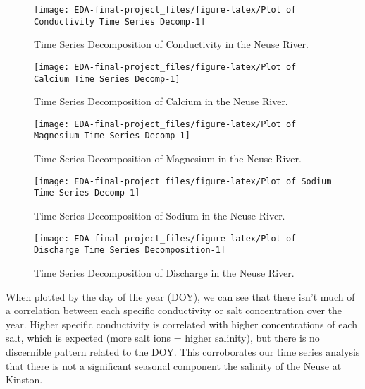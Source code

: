 \documentclass[
  12pt,
]{article}
\begin{document}
\begin{figure}

\texttt{[image: EDA-final-project\_files/figure-latex/Plot of Conductivity Time Series Decomp-1]} \hfill{}

\caption{Time Series Decomposition of Conductivity in the Neuse River.}\label{fig:Plot of Conductivity Time Series Decomp}
\end{figure}

\begin{figure}

\texttt{[image: EDA-final-project\_files/figure-latex/Plot of Calcium Time Series Decomp-1]} \hfill{}

\caption{Time Series Decomposition of Calcium in the Neuse River.}\label{fig:Plot of Calcium Time Series Decomp}
\end{figure}

\begin{figure}

\texttt{[image: EDA-final-project\_files/figure-latex/Plot of Magnesium Time Series Decomp-1]} \hfill{}

\caption{Time Series Decomposition of Magnesium in the Neuse River.}\label{fig:Plot of Magnesium Time Series Decomp}
\end{figure}

\begin{figure}

\texttt{[image: EDA-final-project\_files/figure-latex/Plot of Sodium Time Series Decomp-1]} \hfill{}

\caption{Time Series Decomposition of Sodium in the Neuse River.}\label{fig:Plot of Sodium Time Series Decomp}
\end{figure}

\begin{figure}

\texttt{[image: EDA-final-project\_files/figure-latex/Plot of Discharge Time Series Decomposition-1]} \hfill{}

\caption{Time Series Decomposition of Discharge in the Neuse River.}\label{fig:Plot of Discharge Time Series Decomposition}
\end{figure}

When plotted by the day of the year (DOY), we can see that there isn't
much of a correlation between each specific conductivity or salt
concentration over the year. Higher specific conductivity is correlated
with higher concentrations of each salt, which is expected (more salt
ions = higher salinity), but there is no discernible pattern related to
the DOY. This corroborates our time series analysis that there is not a
significant seasonal component the salinity of the Neuse at Kinston.
\end{document}
